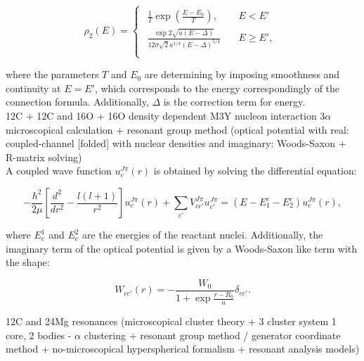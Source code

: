 \documentclass[openany]{book}
\begin{document}
\begin{equation}\label{eq:middleFusion_density_rhoE}
	\rho_2(E) = 	\left\{\begin{array}{l}
		\begin{split}
			\frac{1}{T} \exp {\left( \frac{E - E_0}{T}\right)}, \quad & 	E < E'\\ 
		 	\frac{\exp {2 \sqrt{a(E - \Delta)}}}{12\sigma \sqrt{2} a^{1/4}(E - \Delta)^{5/4}} \quad &  E \ge E',  \\ 
		\end{split}
	\end{array}\right.
\end{equation}

where the parameters $T$ and $E_0$ are determining by imposing smoothness and continuity at $E = E'$, which corresponds to the energy correspondingly of the connection formula. Additionally, $\Delta$ is the correction term for energy. \\

12C + 12C and 16O + 16O density dependent M3Y nucleon interaction $3\alpha$ microscopical calculation + resonant group method (optical potential with real: coupled-channel [folded] with nuclear densities and imaginary: Woods-Saxon + R-matrix solving)  \cite{assuncao_descouvemont_2015} \\

A coupled wave function $u^{J\pi}_c(r)$ is obtained by solving the differential equation: 

\begin{equation}\label{eq:middleFusion_coupledChannels}
	- \frac{\hbar^2}{2\mu} \left[ \frac{d^2}{dr^2} - \frac{l(l+1)}{r^2}\right]u^{J\pi}_c(r) + \sum_{c'}{V^{J\pi}_{cc'} u^{J\pi}_{c'} } = (E - E^{c}_1 - E^{c}_2) u^{J\pi}_c(r),
\end{equation}

where $E^{1}_{c}$ and $E^{2}_{c}$ are the energies of the reactant nuclei. Additionally, the imaginary term of the optical potential is given by a Woods-Saxon like term with the shape:

\begin{equation}\label{eq:middleFusion_coupledChannels_opticalPotential}
	W_{cc'}(r) = - \frac{W_0}{1 + \exp { \frac{r - R_0}{a}}} \delta_{cc'}.
\end{equation}

12C and 24Mg resonances (microscopical cluster theory + 3 cluster system 1 core, 2 bodies - $\alpha$ clustering + resonant group method / generator coordinate method + no-microscopical hyperspherical formalism + resonant analysis models) \cite{descouvemont_2021} \\
\end{document}
